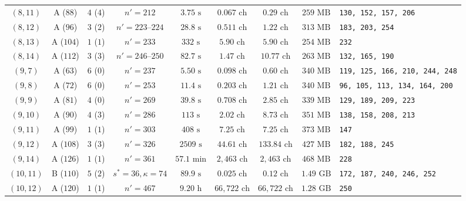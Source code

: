 \documentclass[11pt,a4paper]{article}
\theoremstyle{definition}
\theoremstyle{remark}
\begin{document}
\begin{table}[t]
{{\begin{tabular}{@{}cccccccc>{\raggedright\arraybackslash}p{3.45cm}@{}}
$(8, 11)$  & A ($88$)  & $4$ ($4$)   & $n'=212$             & $3.75\text{ s}$ & $0.067\text{ ch}$ & $0.29\text{ ch}$     & $259\text{ MB}$ & \texttt{130, 152, 157, 206} \\
$(8, 12)$  & A ($96$)  & $3$ ($2$)   & $n'=223\text{--}224$ & $28.8\text{ s}$ & $0.511\text{ ch}$ & $1.22\text{ ch}$     & $313\text{ MB}$ & \texttt{183, 203, 254} \\
$(8, 13)$  & A ($104$) & $1$ ($1$)   & $n'=233$             & $332\text{ s}$  & $5.90\text{ ch}$  & $5.90\text{ ch}$     & $254\text{ MB}$ & \texttt{232} \\
$(8, 14)$  & A ($112$) & $3$ ($3$)   & $n'=246\text{--}250$ & $82.7\text{ s}$ & $1.47\text{ ch}$  & $10.77\text{ ch}$    & $263\text{ MB}$ & \texttt{132, 165, 190} \\
$(9, 7)$   & A ($63$)  & $6$ ($0$)   & $n'=237$             & $5.50\text{ s}$ & $0.098\text{ ch}$ & $0.60\text{ ch}$     & $340\text{ MB}$ & \texttt{119, 125, 166, 210, 244, 248} \\
$(9, 8)$   & A ($72$)  & $6$ ($0$)   & $n'=253$             & $11.4\text{ s}$ & $0.203\text{ ch}$ & $1.21\text{ ch}$     & $340\text{ MB}$ & \texttt{96, 105, 113, 134, 164, 200} \\
$(9, 9)$   & A ($81$)  & $4$ ($0$)   & $n'=269$             & $39.8\text{ s}$ & $0.708\text{ ch}$ & $2.85\text{ ch}$     & $339\text{ MB}$ & \texttt{129, 189, 209, 223} \\
$(9, 10)$  & A ($90$)  & $4$ ($3$)   & $n'=286$             & $113\text{ s}$  & $2.02\text{ ch}$  & $8.73\text{ ch}$     & $351\text{ MB}$ & \texttt{138, 158, 208, 213} \\
$(9, 11)$  & A ($99$)  & $1$ ($1$)   & $n'=303$             & $408\text{ s}$  & $7.25\text{ ch}$  & $7.25\text{ ch}$     & $373\text{ MB}$ & \texttt{147} \\
$(9, 12)$  & A ($108$) & $3$ ($3$)   & $n'=326$             & $2509\text{ s}$ & $44.61\text{ ch}$ & $133.84\text{ ch}$   & $427\text{ MB}$ & \texttt{182, 188, 245} \\
$(9, 14)$  & A ($126$) & $1$ ($1$)   & $n'=361$             & $57.1\text{ min}$ & $2{,}463\text{ ch}$ & $2{,}463\text{ ch}$ & $468\text{ MB}$ & \texttt{228} \\
$(10, 11)$ & B ($110$) & $5$ ($2$)   & $s^*=36, \kappa=74$  & $89.9\text{ s}$ & $0.025\text{ ch}$ & $0.12\text{ ch}$     & $1.49\text{ GB}$ & \texttt{172, 187, 240, 246, 252} \\
$(10, 12)$ & A ($120$) & $1$ ($1$)   & $n'=467$             & $9.20\text{ h}$ & $66{,}722\text{ ch}$ & $66{,}722\text{ ch}$ & $1.28\text{ GB}$ & \texttt{250} \\

\end{tabular}}}
\end{table}
\end{document}
